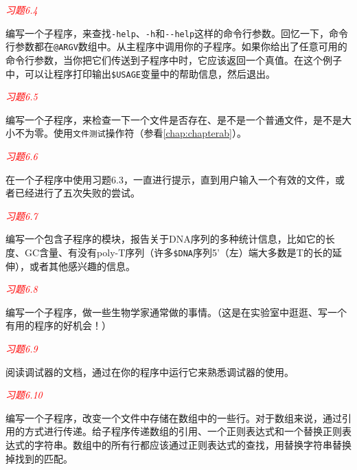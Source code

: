 \textcolor{red}{\textit{习题6.4}}
\begin{adjustwidth}{2em}{}
编写一个子程序，来查找\verb|-help|、\verb|-h|和\verb|--help|这样的命令行参数。回忆一下，命令行参数都在\verb|@ARGV|数组中。从主程序中调用你的子程序。如果你给出了任意可用的命令行参数，当你把它们传送到子程序中时，它应该返回一个真值。在这个例子中，可以让程序打印输出\verb|$USAGE|变量中的帮助信息，然后退出。
\end{adjustwidth}

\textcolor{red}{\textit{习题6.5}}
\begin{adjustwidth}{2em}{}
编写一个子程序，来检查一下一个文件是否存在、是不是一个普通文件，是不是大小不为零。使用\verb|文件测试|操作符（参看\autoref{chap:chapterab}）。
\end{adjustwidth}

\textcolor{red}{\textit{习题6.6}}
\begin{adjustwidth}{2em}{}
在一个子程序中使用习题6.3，一直进行提示，直到用户输入一个有效的文件，或者已经进行了五次失败的尝试。
\end{adjustwidth}

\textcolor{red}{\textit{习题6.7}}
\begin{adjustwidth}{2em}{}
编写一个包含子程序的模块，报告关于DNA序列的多种统计信息，比如它的长度、GC含量、有没有poly-T序列（许多\verb|$DNA|序列5'（左）端大多数是T的长的延伸），或者其他感兴趣的信息。
\end{adjustwidth}

\textcolor{red}{\textit{习题6.8}}
\begin{adjustwidth}{2em}{}
编写一个子程序，做一些生物学家通常做的事情。（这是在实验室中逛逛、写一个有用的程序的好机会！）
\end{adjustwidth}

\textcolor{red}{\textit{习题6.9}}
\begin{adjustwidth}{2em}{}
阅读调试器的文档，通过在你的程序中运行它来熟悉调试器的使用。
\end{adjustwidth}

\textcolor{red}{\textit{习题6.10}}
\begin{adjustwidth}{2em}{}
编写一个子程序，改变一个文件中存储在数组中的一些行。对于数组来说，通过引用的方式进行传递。给子程序传递数组的引用、一个正则表达式和一个替换正则表达式的字符串。数组中的所有行都应该通过正则表达式的查找，用替换字符串替换掉找到的匹配。
\end{adjustwidth}

